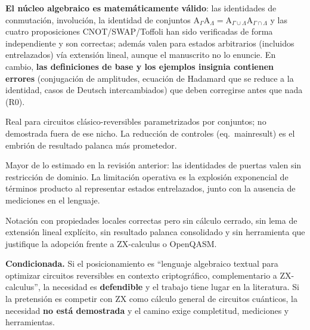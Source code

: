\documentclass[12pt, a4paper]{article}
\newcommand{\gate}[1]{\text{#1}}
\begin{document}
\begin{description}[leftmargin=2cm, style=nextline]
  \item[Validez]
        \textbf{El núcleo algebraico es matemáticamente válido}: las
        identidades de conmutación, involución, la identidad de conjuntos
        $\gate{A}_\Gamma\gate{A}_\Lambda=\gate{A}_{\Gamma\cup\Lambda}
          \gate{A}_{\Gamma\cap\Lambda}$ y las cuatro proposiciones
        CNOT/SWAP/Toffoli han sido verificadas de forma independiente y son
        correctas; además valen para estados arbitrarios (incluidos
        entrelazados) vía extensión lineal, aunque el manuscrito no lo
        enuncie. En cambio, \textbf{las definiciones de base y los ejemplos
          insignia contienen errores} (conjugación de amplitudes, ecuación de
        Hadamard que se reduce a la identidad, casos de Deutsch
        intercambiados) que deben corregirse antes que nada (R0).

  \item[Utilidad]
        Real para circuitos clásico-reversibles parametrizados por conjuntos;
        no demostrada fuera de ese nicho. La reducción de controles
        (eq.~mainresult) es el embrión de resultado palanca más prometedor.

  \item[Ámbito]
        Mayor de lo estimado en la revisión anterior: las identidades de
        puertas valen sin restricción de dominio. La limitación operativa es
        la explosión exponencial de términos producto al representar estados
        entrelazados, junto con la ausencia de mediciones en el lenguaje.

  \item[Alcance]
        Notación con propiedades locales correctas pero sin cálculo cerrado,
        sin lema de extensión lineal explícito, sin resultado palanca
        consolidado y sin herramienta que justifique la adopción frente a
        ZX-calculus o OpenQASM.

  \item[Necesidad]
        \textbf{Condicionada.}
        Si el posicionamiento es ``lenguaje algebraico textual para optimizar
        circuitos reversibles en contexto criptográfico, complementario a
        ZX-calculus'', la necesidad es \textbf{defendible} y el trabajo tiene
        lugar en la literatura. Si la pretensión es competir con ZX como cálculo
        general de circuitos cuánticos, la necesidad \textbf{no está demostrada}
        y el camino exige completitud, mediciones y herramientas.
\end{description}
\end{document}
